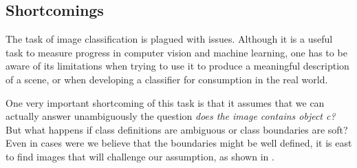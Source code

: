 



\subsection{Shortcomings}

The task of image classification is plagued with issues. Although it is a useful task to measure progress in computer vision and machine learning, one has to be aware of its limitations when trying to use it to produce a meaningful description of a scene, or when developing a classifier for consumption in the real world.  

One very important shortcoming of this task is that it assumes that we can actually answer unambiguously the question {\em does the image contains object c?} But what happens if class definitions are ambiguous or class boundaries are soft? Even in cases were we believe that the boundaries might be well defined, it is east to find images that will challenge our assumption, as shown in \fig{\ref{fig:whatisacar}}.


